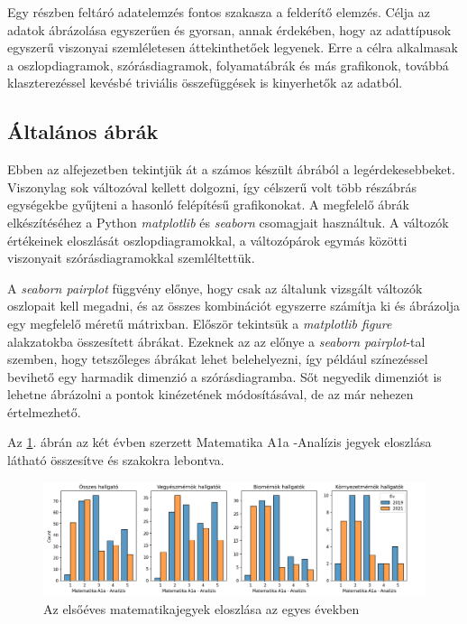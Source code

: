 \documentclass[12pt]{article}
\begin{document}
Egy részben feltáró adatelemzés fontos szakasza a felderítő elemzés. Célja az adatok ábrázolása egyszerűen és gyorsan, annak érdekében, hogy az adattípusok egyszerű viszonyai szemléletesen áttekinthetőek legyenek. Erre a célra alkalmasak a oszlopdiagramok, szórásdiagramok, folyamatábrák és más grafikonok, továbbá klaszterezéssel kevésbé triviális összefüggések is kinyerhetők az adatból.

\subsection{Általános ábrák}
\label{ssec:altalanos}

Ebben az alfejezetben tekintjük át a számos készült ábrából a legérdekesebbeket. Viszonylag sok változóval kellett dolgozni, így célszerű volt több részábrás egységekbe gyűjteni a hasonló felépítésű grafikonokat. A megfelelő ábrák elkészítéséhez a Python \emph{matplotlib} és \emph{seaborn} csomagjait használtuk. A változók értékeinek eloszlását oszlopdiagramokkal, a változópárok egymás közötti viszonyait szórásdiagramokkal szemléltettük.

A \textit{seaborn pairplot} függvény előnye, hogy csak az általunk vizsgált változók oszlopait kell megadni, és az összes kombinációt egyszerre számítja ki és ábrázolja egy megfelelő méretű mátrixban. Először tekintsük a \textit{matplotlib figure} alakzatokba összesített ábrákat. Ezeknek az az előnye a \textit{seaborn pairplot}-tal szemben, hogy tetszőleges ábrákat lehet belehelyezni, így például színezéssel bevihető egy harmadik dimenzió a szórásdiagramba. Sőt negyedik dimenziót is lehetne ábrázolni a pontok kinézetének módosításával, de az már nehezen értelmezhető.


Az \ref{fig:jegyeloszlas}. ábrán az két évben szerzett Matematika A1a -Analízis jegyek eloszlása látható összesítve és szakokra lebontva. 



\begin{figure}[H] 
\centering
\includegraphics[width=\textwidth]{kepek/jegyek_eloszlas2.png}
\caption{Az elsőéves matematikajegyek eloszlása az egyes években}
\label{fig:jegyeloszlas}
\end{figure} 
\end{document}
